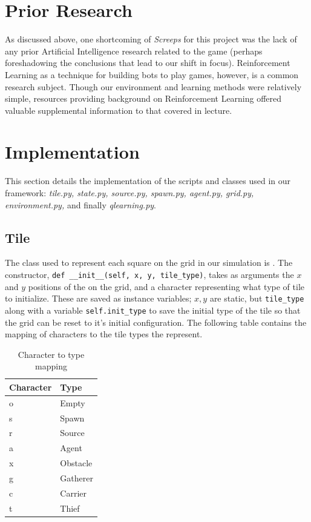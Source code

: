 \documentclass[11pt]{article}
\begin{document}
\section{Prior Research}

As discussed above, one shortcoming of \textit{Screeps} for this project was the lack of any prior Artificial Intelligence research related to the game (perhaps foreshadowing the conclusions that lead to our shift in focus). Reinforcement Learning as a technique for building bots to play games, however, is a common research subject. Though our environment and learning methods were relatively simple, resources providing background on Reinforcement Learning offered valuable supplemental information to that covered in lecture.

\section{Implementation}

This section details the implementation of the scripts and classes used in our framework: \textit{tile.py, state.py, source.py, spawn.py, agent.py, grid.py, environment.py,} and finally \textit{qlearning.py}.

\subsection{Tile}

The class used to represent each square on the grid in our simulation is . The constructor, \texttt{def __init__(self, x, y, tile_type)}, takes as arguments the $x$ and $y$ positions of the  on the grid, and a character representing what type of tile to initialize. These are saved as instance variables; $x, y$ are static, but \texttt{tile_type} along with a variable \texttt{self.init_type} to save the initial type of the tile so that the grid can be reset to it's initial configuration. The following table contains the mapping of characters to the tile types the represent.

\begin{table}[h]
\centering
\caption{Character to type mapping}
\begin{tabular}{|l|l|}
\hline
Character & Type \\ \hline
o & Empty \\ \hline
s & Spawn \\ \hline
r & Source \\ \hline
a & Agent \\ \hline
x & Obstacle \\ \hline
g & Gatherer \\ \hline
c & Carrier \\ \hline
t & Thief \\ \hline
\end{tabular}
\end{table}
\end{document}
